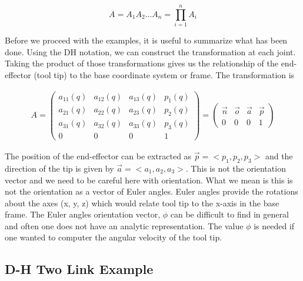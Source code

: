 \[A = A_1A_2 \dots A_n = \prod_{i=1}^n A_i\]

Before we proceed with the examples, it is useful to summarize what has
been done. Using the DH notation, we can construct the transformation at
each joint. Taking the product of those transformations gives us the
relationship of the end-effector (tool tip) to the base coordinate
system or frame. The transformation is

\[\begin{aligned}
A =
\begin{pmatrix} a_{11}(q) & a_{12}(q) & a_{13}(q) & p_1(q) \\
a_{21}(q) & a_{22}(q) & a_{23}(q) & p_2(q) \\
a_{31}(q) & a_{32}(q) & a_{33}(q) & p_3(q) \\
0 & 0 & 0 & 1 \end{pmatrix} =
\begin{pmatrix} \vec{n} & \vec{o} & \vec{a} & \vec{p} \\ 0 & 0 & 0 & 1 \end{pmatrix}
\end{aligned}\]

The position of the end-effector can be extracted as
\(\vec{p} = <p_1, p_2, p_3>\) and the direction of the tip is given by
\(\vec{a}=<a_1,a_2,a_3>\). This is not the orientation vector and we
need to be careful here with orientation. What we mean is this is not
the orientation as a vector of Euler angles. Euler angles provide the
rotations about the axes (x, y, z) which would relate tool tip to the
x-axis in the base frame. The Euler angles orientation vector, \(\phi\)
can be difficult to find in general and often one does not have an
analytic representation. The value \(\phi\) is needed if one wanted to
computer the angular velocity of the tool tip.

\hypertarget{d-h-two-link-example}{%
\subsection{D-H Two Link Example}\label{d-h-two-link-example}}

